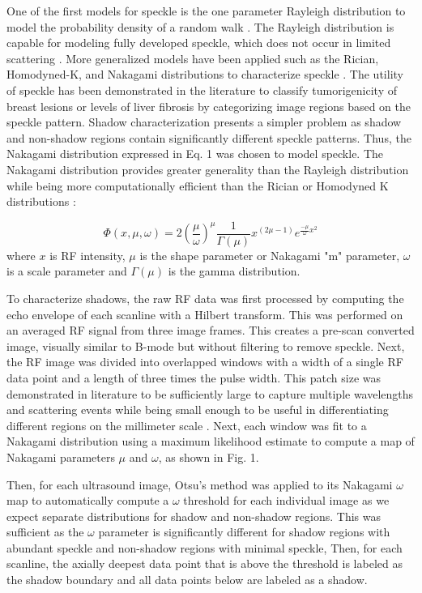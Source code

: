 \documentclass[authoryear,preprint,review,12pt]{elsarticle}
\begin{document}
One of the first models for speckle is the one parameter Rayleigh distribution to model the probability density of a random walk \citep{Burckhardt1978}. The Rayleigh distribution is capable for modeling fully developed speckle, which does not occur in limited scattering \citep{Tuthill1988}. More generalized models have been applied such as the Rician, Homodyned-K, and Nakagami distributions to characterize speckle \citep{Destrempes2010}. The utility of speckle has been demonstrated in the literature to classify tumorigenicity of breast lesions \citep{Byra2016} or levels of liver fibrosis \citep{Ho2012} by categorizing image regions based on the speckle pattern. Shadow characterization presents a simpler problem as shadow and non-shadow regions contain significantly different speckle patterns. Thus, the Nakagami distribution expressed in Eq. 1 was chosen to model speckle. The Nakagami distribution provides greater generality than the Rayleigh distribution while being more computationally efficient than the Rician or Homodyned K distributions \citep{Destrempes2010}:

\begin{equation}
\Phi(x,\mu,\omega) = 2(\frac{\mu}{\omega})^{\mu}\frac{1}{\Gamma(\mu)}x^{(2\mu-1)}e^{\frac{-\mu}{\omega}x^{2}}
\end{equation}where $x$ is RF intensity, $\mu$ is the shape parameter or Nakagami "m" parameter, $\omega$ is a scale parameter and $\Gamma(\mu)$ is the gamma distribution.

To characterize shadows, the raw RF data was first processed by computing the echo envelope of each scanline with a Hilbert transform. This was performed on an averaged RF signal from three image frames. This creates a pre-scan converted image, visually similar to B-mode but without filtering to remove speckle. Next, the RF image was divided into overlapped windows with a width of a single RF data point and a length of three times the pulse width. This patch size was demonstrated in literature to be sufficiently large to capture multiple wavelengths and scattering events while being small enough to be useful in differentiating different regions on the millimeter scale \citep{Byra2016}. Next, each window was fit to a Nakagami distribution using a maximum likelihood estimate to compute a map of Nakagami parameters $\mu$ and $\omega$, as shown in Fig. 1.

Then, for each ultrasound image, Otsu’s method was applied to its Nakagami $\omega$ map to automatically compute a $\omega$ threshold for each individual image as we expect separate distributions for shadow and non-shadow regions. This was sufficient as the $\omega$ parameter is significantly different for shadow regions with abundant speckle and non-shadow regions with minimal speckle, Then, for each scanline, the axially deepest data point that is above the threshold is labeled as the shadow boundary and all data points below are labeled as a shadow.
\end{document}

